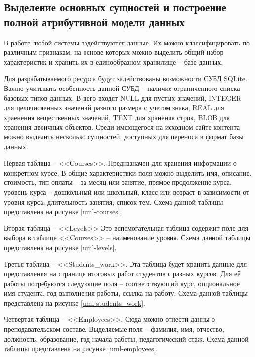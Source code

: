 \subsection{Выделение основных сущностей и построение полной атрибутивной модели данных}

В работе любой системы задействуются данные.
Их можно классифицировать по различным признакам, на основе которых можно выделить общий набор характеристик и хранить их в единообразном хранилище -- базе данных.

Для разрабатываемого ресурса будут задействованы возможности СУБД SQLite.
Важно учитывать особенность данной СУБД -- наличие ограниченного списка базовых типов данных.
В него входят NULL для пустых значений, INTEGER для целочисленных значений разного размера с учетом знака, REAL для храенения вещественных значений, TEXT для хранения строк, BLOB для хранения двоичных объектов.
Среди имеющегося на исходном сайте контента можно выделить несколько сущностей, доступных для переноса в формат базы данных.

Первая таблица -- <<Courses>>.
Предназначен для хранения информации о конкретном курсе.
В общие характеристики-поля можно выделить имя, описание, стоимость, тип оплаты -- за месяц или занятие, прямое продолжение курса, уровень курса -- дошкольный или школьный, класс или возраст в зависимости от уровня курса, длительность занятия, список тем.
Схема данной таблицы представлена на рисунке \ref{uml-courses}.

Вторая таблица -- <<Levels>>
Это вспомогательная таблица содержит поле для выбора в таблице <<Courses>> -- наименование уровня.
Схема данной таблицы представлена на рисунке \ref{uml-levels}.

Третья таблица -- <<Students\_work>>.
Эта таблица будет хранить данные для представления на странице итоговых работ студентов с разных курсов.
Для её работы потребуются следующие поля -- соответствующий курс, опциональное имя студента, год выполнения работы, ссылка на работу.
Схема данной таблицы представлена на рисунке \ref{uml-students_work}.

Четвертая таблица -- <<Employees>>.
Сюда можно отнести данны о преподавательском составе.
Выделяемые поля -- фамилия, имя, отчество, должность, образование, год начала работы, педагогический стаж.
Схема данной таблицы представлена на рисунке \ref{uml-employees}.

